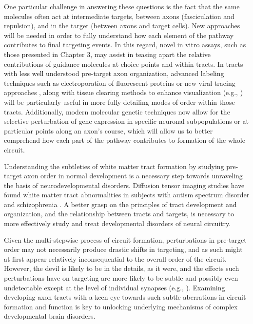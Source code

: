 One particular challenge in answering these questions is the fact that the same molecules often act at intermediate targets, between axons (fasciculation and repulsion), and in the target (between axons and target cells).
New approaches will be needed in order to fully understand how each element of the pathway contributes to final targeting events.
In this regard, novel in vitro assays, such as those presented in Chapter 3, may assist in teasing apart the relative contributions of guidance molecules at choice points and within tracts.
In tracts with less well understood pre-target axon organization, advanced labeling techniques such as electroporation of fluorescent proteins \cite{saito2001efficient} or new viral tracing approaches \cite{reardon2016rabies}, along with tissue clearing methods to enhance visualization (e.g., ) will be particularly useful in more fully detailing modes of order within those tracts.
Additionally, modern molecular genetic techniques now allow for the selective perturbation of gene expression in specific neuronal subpopulations or at particular points along an axon's course, which will allow us to better comprehend how each part of the pathway contributes to formation of the whole circuit.

Understanding the subtleties of white matter tract formation by studying pre-target axon order in normal development is a necessary step towards unraveling the basis of neurodevelopmental disorders.
Diffusion tensor imaging studies have found white matter tract abnormalities in subjects with autism spectrum disorder \cite{wolff2012differences} and schizophrenia \cite{kubicki2007review}.
A better grasp on the principles of tract development and organization, and the relationship between tracts and targets, is necessary to more effectively study and treat developmental disorders of neural circuitry.

Given the multi-stepwise process of circuit formation, perturbations in pre-target order may not necessarily produce drastic shifts in targeting, and as such might at first appear relatively inconsequential to the overall order of the circuit.
However, the devil is likely to be in the details, as it were, and the effects such perturbations have on targeting are more likely to be subtle and possibly even undetectable except at the level of individual synapses (e.g., ).
Examining developing axon tracts with a keen eye towards such subtle aberrations in circuit formation and function is key to unlocking underlying mechanisms of complex developmental brain disorders.

